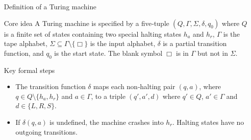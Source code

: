 \begin{frame}[t]{Definition of a Turing machine}
  \begin{tblock}{Core idea}
    A Turing machine is specified by a five‑tuple $(Q,\Gamma,\Sigma,\delta,q_0)$
    where $Q$ is a finite set of states containing two special halting
    states $h_a$ and $h_r$, $\Gamma$ is the tape alphabet, $\Sigma\subseteq
    \Gamma \setminus \{\Box\}$ is the input alphabet, $\delta$ is a partial
    transition function, and $q_0$ is the start state.  The blank
    symbol $\Box$ is in $\Gamma$ but not in $\Sigma$.
  \end{tblock}
  \begin{tblock}{Key formal steps}
    \begin{itemize}
      \item The transition function $\delta$ maps each non‑halting
        pair $(q,a)$, where $q\in Q\setminus\{h_a,h_r\}$ and $a\in \Gamma$, to
        a triple $(q',a',d)$ where $q'\in Q$, $a'\in \Gamma$ and
        $d\in\{L,R,S\}$.
      \item If $\delta(q,a)$ is undefined, the machine crashes into
        $h_r$.  Halting states have no outgoing transitions.
    \end{itemize}
  \end{tblock}
  \label{fr:7.1-08}
\end{frame}

